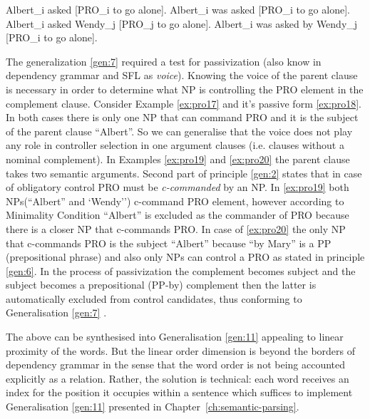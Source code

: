 \begin{exe}
	\ex\label{ex:pro17} Albert_i asked [PRO_i to go alone].
	\ex\label{ex:pro18} Albert_i was asked [PRO_i to go alone].
	\ex\label{ex:pro19} Albert_i asked Wendy_j [PRO_j to go alone].
	\ex\label{ex:pro20} Albert_i was asked by Wendy_j [PRO_i to go alone].
\end{exe}


The generalization \ref{gen:7} required a test for passivization (also know in dependency grammar and SFL as \textit{voice}). Knowing the voice of the parent clause is necessary in order to determine what NP is controlling the PRO element in the complement clause. Consider Example \ref{ex:pro17} and it's passive form \ref{ex:pro18}. In both cases there is only one NP that can command PRO and it is the subject of the parent clause ``Albert''. So we can generalise that the voice does not play any role in controller selection in one argument clauses (i.e. clauses without a nominal complement). In Examples \ref{ex:pro19} and \ref{ex:pro20} the parent clause takes two semantic arguments. Second part of principle \ref{gen:2} states that in case of obligatory control PRO must be \textit{c-commanded} by an NP. In \ref{ex:pro19} both NPs(``Albert'' and `Wendy'') c-command PRO element, however according to Minimality Condition\citep[479]{Haegeman1991} ``Albert'' is excluded as the commander of PRO because there is a closer NP that c-commands PRO. In case of \ref{ex:pro20} the only NP that c-commands PRO is the subject ``Albert'' because ``by Mary'' is a PP (prepositional phrase) and also only NPs can control a PRO as stated in principle \ref{gen:6}. In the process of passivization the complement becomes subject and the subject becomes a prepositional (PP-by) complement then the latter is automatically excluded from control candidates, thus conforming to Generalisation \ref{gen:7} \citep[281]{Haegeman1991}. 

The above can be synthesised into Generalisation \ref{gen:11} appealing to linear proximity of the words. But the linear order dimension is beyond the borders of dependency grammar in the sense that the word order is not being accounted explicitly as a relation. Rather, the solution is technical: each word receives an index for the position it occupies within a sentence which suffices to implement Generalisation \ref{gen:11} presented in \mbox{Chapter \ref{ch:semantic-parsing}}.

